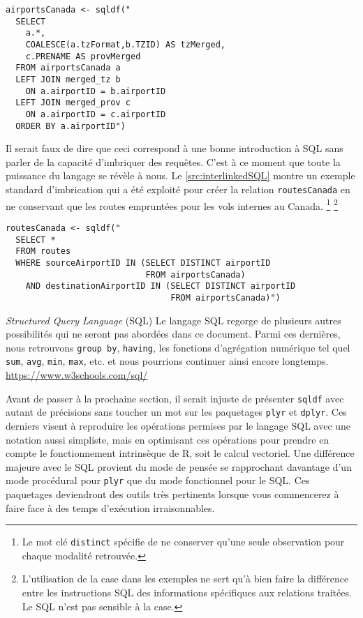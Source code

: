 \begin{lstlisting}[caption = Fonctionnalités avancées de SQL,label=src:advancedSQL]
airportsCanada <- sqldf("
  SELECT 
    a.*, 
    COALESCE(a.tzFormat,b.TZID) AS tzMerged,
    c.PRENAME AS provMerged
  FROM airportsCanada a 
  LEFT JOIN merged_tz b
  	ON a.airportID = b.airportID
  LEFT JOIN merged_prov c
  	ON a.airportID = c.airportID
  ORDER BY a.airportID")
\end{lstlisting}

\vspace{\baselineskip}
Il serait faux de dire que ceci correspond à une bonne introduction à SQL sans parler de la capacité d'imbriquer des requêtes. C'est à ce moment que toute la puissance du langage se révèle à nous. Le \autoref{src:interlinkedSQL} montre un exemple standard d'imbrication qui a été exploité pour créer la relation \texttt{routesCanada} en ne conservant que les routes empruntées pour les vols internes au Canada. \footnote{Le mot clé \texttt{distinct} spécifie de ne conserver qu'une seule observation pour chaque modalité retrouvée.} \footnote{L'utilisation de la case dans les exemples ne sert qu'à bien faire la différence entre les instructions SQL des informations spécifiques aux relations traitées. Le SQL n'est pas sensible à la case.}

\begin{lstlisting}[caption = Fonctionnalités avancées de SQL,label=src:interlinkedSQL]
routesCanada <- sqldf("
  SELECT *
  FROM routes
  WHERE sourceAirportID IN (SELECT DISTINCT airportID
                            FROM airportsCanada)
    AND destinationAirportID IN (SELECT DISTINCT airportID
                                 FROM airportsCanada)")                           
\end{lstlisting}

\begin{moreInfo}{\emph{Structured Query Language} (SQL)}
	Le langage SQL regorge de plusieurs autres possibilités qui ne seront pas abordées dans ce document. Parmi ces dernières, nous retrouvons \texttt{group by}, \texttt{having}, les fonctions d'agrégation numérique tel quel \texttt{sum}, \texttt{avg}, \texttt{min}, \texttt{max}, etc. et nous pourrions continuer ainsi encore longtemps. \\
	\url{https://www.w3schools.com/sql/}
\end{moreInfo}

Avant de passer à la prochaine section, il serait injuste de présenter \texttt{sqldf} avec autant de précisions sans toucher un mot sur les paquetages \texttt{plyr} et \texttt{dplyr}. Ces derniers visent à reproduire les opérations permises par le langage SQL avec une notation aussi simpliste, mais en optimisant ces opérations pour prendre en compte le fonctionnement intrinsèque de R, soit le calcul vectoriel. Une différence majeure avec le SQL provient du mode de pensée se rapprochant davantage d'un mode procédural pour \texttt{plyr} que du mode fonctionnel pour le SQL. Ces paquetages deviendront des outils très pertinents lorsque vous commencerez à faire face à des temps d'exécution irraisonnables. \cite{dplyrVSsqldf}

